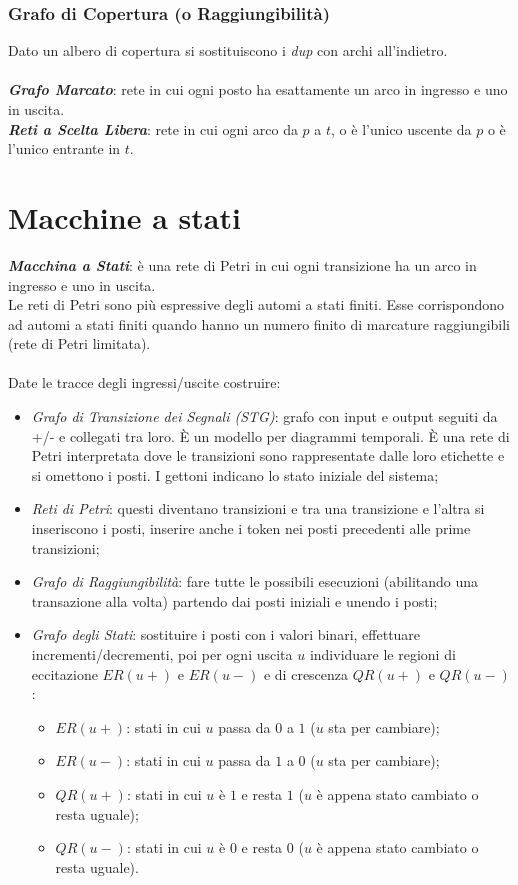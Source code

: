\documentclass[a4paper, notitlepage, 10pt]{report}
\begin{document}
\subsection*{Grafo di Copertura (o Raggiungibilità)}
Dato un albero di copertura si sostituiscono i \textit{dup} con archi all'indietro.
\\\\
\textit{\textbf{Grafo Marcato}}: rete in cui ogni posto ha esattamente un arco in ingresso e uno in uscita.
\\
\textit{\textbf{Reti a Scelta Libera}}: rete in cui ogni arco da $p$ a $t$, o è l'unico uscente da $p$ o è l'unico entrante in $t$.



\chapter*{Macchine a stati}
\textit{\textbf{Macchina a Stati}}: è una rete di Petri in cui ogni transizione ha un arco in ingresso e uno in uscita.\\
Le reti di Petri sono più espressive degli automi a stati finiti. Esse corrispondono ad automi a stati finiti quando hanno un numero finito di marcature raggiungibili (rete di Petri limitata).
\\\\
Date le tracce degli ingressi/uscite costruire:
\begin{itemize}
	\item \textit{Grafo di Transizione dei Segnali (STG)}: grafo con input e output seguiti da +/- e collegati tra loro. È un modello per diagrammi temporali. È una rete di Petri interpretata dove le transizioni sono rappresentate dalle loro etichette e si omettono i posti. I gettoni indicano lo stato iniziale del sistema;
	\item \textit{Reti di Petri}: questi diventano transizioni e tra una transizione e l'altra si inseriscono i posti, inserire anche i token nei posti precedenti alle prime transizioni;
	\item \textit{Grafo di Raggiungibilità}: fare tutte le possibili esecuzioni (abilitando una transazione alla volta) partendo dai posti iniziali e unendo i posti;
	\item \textit{Grafo degli Stati}: sostituire i posti con i valori binari, effettuare incrementi/decrementi, poi per ogni uscita $u$ individuare le regioni di eccitazione $ER(u+)$ e $ER(u-)$ e di crescenza $QR(u+)$ e $QR(u-)$:
	\begin{itemize}
		\item $ER(u+)$: stati in cui $u$ passa da $0$ a $1$ ($u$ sta per cambiare);
		\item $ER(u-)$: stati in cui $u$ passa da $1$ a $0$ ($u$ sta per cambiare);
		\item $QR(u+)$: stati in cui $u$ è $1$ e resta $1$ ($u$ è appena stato cambiato o resta uguale);
		\item $QR(u-)$: stati in cui $u$ è $0$ e resta $0$ ($u$ è appena stato cambiato o resta uguale).
	\end{itemize}
\end{itemize}
\end{document}
